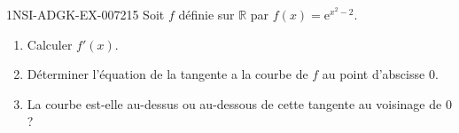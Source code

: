 \begin{exercice}{1NSI-ADGK-EX-007}{2}{15}
Soit $f$ définie sur $\mathbb{R}$ par $f(x) = \mathrm{e}^{x^2 - 2}$.
\begin{enumerate}
  \item Calculer $f'(x)$.
  \item Déterminer l'équation de la tangente a la courbe de $f$ au point d'abscisse $0$.
  \item La courbe est-elle au-dessus ou au-dessous de cette tangente au voisinage de $0$ ?
\end{enumerate}

\end{exercice}
